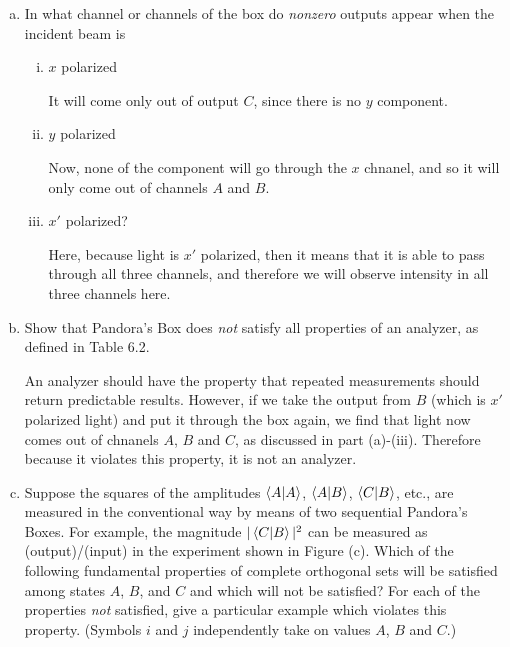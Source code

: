 \documentclass[10pt]{article}
\begin{document}
    \begin{enumerate}[(a)]
        \item In what channel or channels of the box do \textit{nonzero} outputs appear when the incident beam is 
        \begin{enumerate}[(i)]
            \item $x$ polarized
            
            \begin{solution}
                It will come only out of output $C$, since there is no $y$ component.
            \end{solution}
            \item $y$ polarized

            \begin{solution}
                Now, none of the component will go through the $x$ chnanel, and so it will only come out of channels $A$ and $B$.
            \end{solution}
            \item $x'$ polarized?
            
            \begin{solution}
                Here, because light is $x'$ polarized, then it means that it is able to pass through all three channels, and therefore we will observe intensity in all three channels here. 
            \end{solution}
        \end{enumerate}

        \item Show that Pandora's Box does \textit{not} satisfy all properties of an analyzer, as defined in Table 6.2.
        
        \begin{solution}
            An analyzer should have the property that repeated measurements should return predictable results. However, if we take the output from $B$ (which is $x'$ polarized light) and put it through the box again, we find that light now comes out of chnanels $A$, $B$ and $C$, as discussed in part (a)-(iii). Therefore because it violates this property, it is not an analyzer.
        \end{solution}

        \item Suppose the squares of the amplitudes $\braket{A}{A}$, $\braket{A}{B}$, $\braket{C}{B}$, etc., are measured in the conventional way by means of two sequential Pandora's Boxes. For example, the magnitude $|\braket{C}{B}|^2$ can be measured as (output)/(input) in the experiment shown in Figure (c). Which of the following fundamental properties of complete orthogonal sets will be satisfied among states $A$, $B$, and $C$ and which will not be satisfied? For each of the properties \textit{not} satisfied, give a particular example which violates this property. (Symbols $i$ and $j$ independently take on values $A$, $B$ and $C$.)
        

\end{enumerate}
\end{document}

